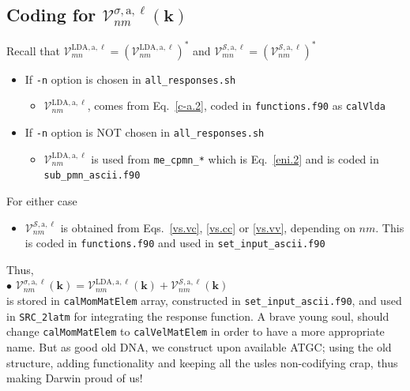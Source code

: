 

\subsection{Coding for \texorpdfstring{$\mathcal{V}^{\sigma,\mathrm{a},\ell}_{nm}(\mathbf{k})$}{Vnm}} 

Recall that 
$\mathcal{V}^{\mathrm{LDA},\mathrm{a},\ell}_{mn}=(\mathcal{V}^{\mathrm{LDA},\mathrm{a},\ell}_{nm})^*$
and 
$\mathcal{V}^{\mathcal{S},\mathrm{a},\ell}_{mn}=(\mathcal{V}^{\mathcal{S},\mathrm{a},\ell}_{nm})^*$ 
\begin{itemize}
\item If \verb=-n= option is chosen in \verb=all_responses.sh=
\begin{itemize}
\item $\mathcal{V}^{\mathrm{LDA},\mathrm{a},\ell}_{nm}$, comes from
  Eq.~\eqref{c-a.2}, coded in \verb=functions.f90= as \verb=calVlda=
\end{itemize}
\item If \verb=-n= option is NOT chosen in \verb=all_responses.sh=
\begin{itemize}
\item $\mathcal{V}^{\mathrm{LDA},\mathrm{a},\ell}_{nm}$ 
is used from \verb=me_cpmn_*=
  which is Eq.~\eqref{eni.2} and is coded in \verb=sub_pmn_ascii.f90=
\end{itemize}
\end{itemize}
For either case
\begin{itemize}
\item $\mathcal{V}^{\mathcal{S},\mathrm{a},\ell}_{nm}$ 
is obtained from
  Eqs.~\eqref{vs.vc}, \eqref{vs.cc} or \eqref{vs.vv}, depending on
  $nm$. This is coded in \verb=functions.f90= and used in 
\verb=set_input_ascii.f90=  
\end{itemize}
Thus,\\
$\bullet$ 
$\mathcal{V}^{\sigma,\mathrm{a},\ell}_{nm}(\mathbf{k})=\mathcal{V}^{\mathrm{LDA},\mathrm{a},\ell}_{nm}(\mathbf{k})+\mathcal{V}^{\mathcal{S},\mathrm{a},\ell}_{nm}(\mathbf{k})$\\ 
is stored in \verb=calMomMatElem=  
array, constructed in 
\verb=set_input_ascii.f90=, and used in \verb=SRC_2latm= for
integrating the response function. A brave young soul, should change   
\verb=calMomMatElem= to \verb=calVelMatElem= in order to have a more
appropriate name. But as good old DNA, we construct upon available
ATGC; using the old structure, adding functionality and  keeping all
the usles non-codifying crap, thus making Darwin
 proud of us! 


